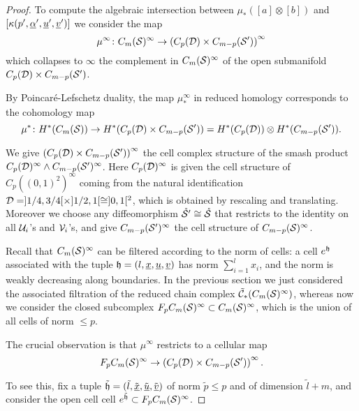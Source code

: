 \begin{proof}
% 

To compute the algebraic intersection
between $\mu_*([a]\otimes [b])$ and $[\kappa(p',\ualpha',\uu',\uv')]$ we
consider the map
\[
 \mu^{\infty}\colon \cms^{\infty}\to \pa{C_p(\D)\times C_{m-p}(\S')}^{\infty}
\]
which collapses to $\infty$ the complement in $\cms^{\infty}$ of the open submanifold $C_p(\D)\times C_{m-p}(\S')$.

By Poincaré-Lefschetz duality, the map $\mu^{\infty}_*$ in reduced homology corresponds to the cohomology map
\[
 \mu^*\colon H^*(\cms)\to H^*(C_p(\D)\times C_{m-p}(\S'))=H^*(C_p(\D))\otimes H^*(C_{m-p}(\S')).
\]

We give $\pa{C_p(\D)\times C_{m-p}(\S')}^{\infty}$ the cell complex structure of the smash product
$C_p(\D)^{\infty}\wedge C_{m-p}(\S')^{\infty}$. Here $C_p(\D)^{\infty}$ is given the cell structure of $C_p((0,1)^2)^{\infty}$
coming from the natural identification $\D=]1/4,3/4[\times]1/2,1[\cong]0,1[^2$, which is obtained by rescaling
and translating. Moreover we choose any diffeomorphism $\mrS'\cong\mrS$ that restricts to the identity
on all $\U_i$'s and $\V_i$'s, and give $C_{m-p}(\S')^{\infty}$ the cell structure of $C_{m-p}(\S)^{\infty}$.

Recall that $\cms^{\infty}$ can be filtered according to the norm of cells: a cell $e^{\tup}$ associated with
the tuple $\tup=(l,\ux,\uu,\uv)$ has norm $\sum_{i=1}^l x_i$, and the norm is weakly decreasing along boundaries.
In the previous section we just considered
the associated filtration of the reduced chain complex $\tCh_*(\cms^{\infty})$, whereas now we
consider the closed subcomplex $F_p\cms^{\infty}\subset\cms^{\infty}$, which is the union
of all cells of norm $\leq p$.

The crucial observation is that $\mu^{\infty}$ restricts to a cellular map 
\[
F_p\cms^{\infty}\to \pa{C_p(\D)\times C_{m-p}(\S')}^{\infty}.
\]

To see this, fix a tuple $\tilde{\tup}=(\tilde{l}, \tilde{\ux},\tilde{\uu},\tilde{\uv})$ of norm $\tilde{p}\leq p$
and of dimension $\tilde{l}+m$, and
consider the open cell
cell $e^{\tilde{\tup}}\subset F_p\cms^{\infty}$.


\end{proof}
